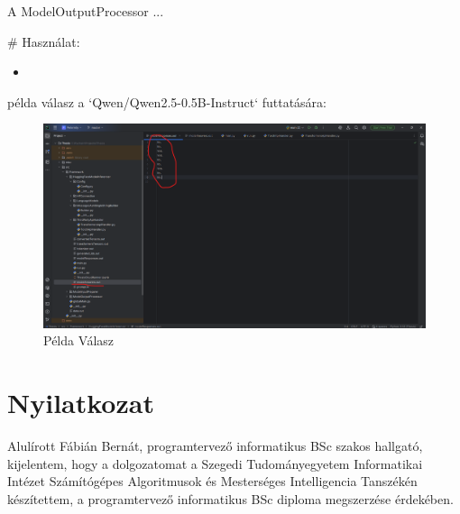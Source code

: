 \documentclass[12pt]{report}
\theoremstyle{definition}
\begin{document}
                         A ModelOutputProcessor ...


                         # Használat:
                         \begin{itemize}
                             \item
                         \end{itemize}
                         példa válasz a `Qwen/Qwen2.5-0.5B-Instruct` futtatására:
                         \begin{figure}
                             \centering
                             \includegraphics[keepaspectratio]{pelda}
                             \caption{Példa Válasz}
                             \label{fig:PeldaValasz}
                         \end{figure}


\chapter*{Nyilatkozat}




\noindent
Alulírott Fábián Bernát, programtervező informatikus BSc szakos hallgató, kijelentem, hogy a dolgozatomat a Szegedi Tudományegyetem Informatikai Intézet Számítógépes Algoritmusok és Mesterséges Intelligencia Tanszékén készítettem, a programtervező informatikus BSc diploma megszerzése érdekében.
\end{document}
